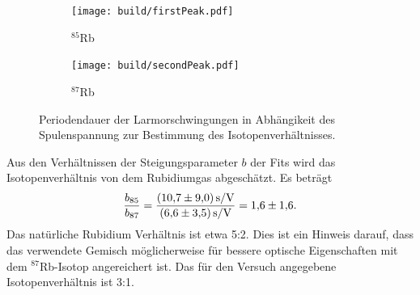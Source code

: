 \begin{figure}[h]
	\centering
	\begin{subfigure}[c]{0.45\textwidth}
	\begin{center}
		\texttt{[image: build/firstPeak.pdf]}
	\end{center}
	\caption{$^{85}$Rb}%
	\label{fig:}
	\end{subfigure}
	\begin{subfigure}[c]{0.45\textwidth}
	\begin{center}
	\texttt{[image: build/secondPeak.pdf]}
	\end{center}
	\caption{$^{87}$Rb}%
	\label{fig:}
	\end{subfigure}
	\caption{Periodendauer der Larmorschwingungen in Abhängikeit des
	Spulenspannung zur Bestimmung des Isotopenverhältnisses.}%
	\label{fig:fitexp}
\end{figure}
Aus den Verhältnissen der Steigungsparameter $b$ der Fits wird das
Isotopenverhältnis von dem Rubidiumgas abgeschätzt.
Es beträgt
\begin{equation}
	\frac{b_{85}}{b_{87}} =
	\frac{\SI{10.7+-9.0}{\second\per\volt}}{\SI{6.6+-3.5}{\second\per\volt}} =
	\num{1.6 +- 1.6}.
\end{equation}
Das natürliche Rubidium Verhältnis ist etwa 5:2.
Dies ist ein Hinweis darauf, dass das verwendete Gemisch möglicherweise für
bessere optische Eigenschaften mit dem $^{87}$Rb-Isotop angereichert ist.
Das für den Versuch angegebene Isotopenverhältnis ist 3:1.
